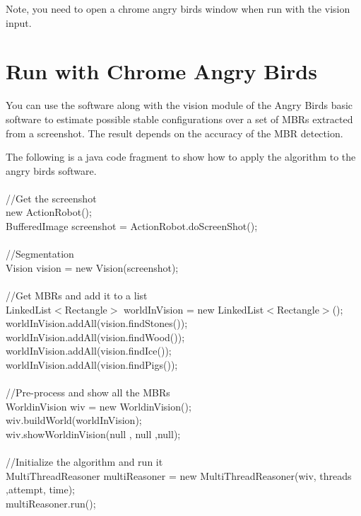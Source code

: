 \documentclass{article}
\begin{document}
Note, you need to open a chrome angry birds window when run with the vision input.

\section{Run with Chrome Angry Birds} 
You can use the software along with the vision module of the Angry Birds basic software to estimate possible stable configurations over a set of MBRs extracted from a screenshot. The result depends on the accuracy of the MBR detection. 

The following is a java code fragment to show how to apply the algorithm to the angry birds software.
\\
\\//Get the screenshot
\\new ActionRobot();
\\BufferedImage screenshot = ActionRobot.doScreenShot();
\\
\\//Segmentation
\\Vision vision = new Vision(screenshot);
\\\\//Get MBRs and add it to a list
\\ LinkedList$<$Rectangle$>$ worldInVision = new LinkedList$<$Rectangle$>$(); 
\\worldInVision.addAll(vision.findStones());
\\worldInVision.addAll(vision.findWood());
\\ worldInVision.addAll(vision.findIce());
\\worldInVision.addAll(vision.findPigs());
\\
\\//Pre-process and show all the MBRs  
\\WorldinVision wiv = new WorldinVision();
\\wiv.buildWorld(worldInVision); 
\\wiv.showWorldinVision(null , null ,null);
\\
\\//Initialize the algorithm and run it	  
\\MultiThreadReasoner multiReasoner = new MultiThreadReasoner(wiv, threads ,attempt, time); 
\\multiReasoner.run();
\end{document}
